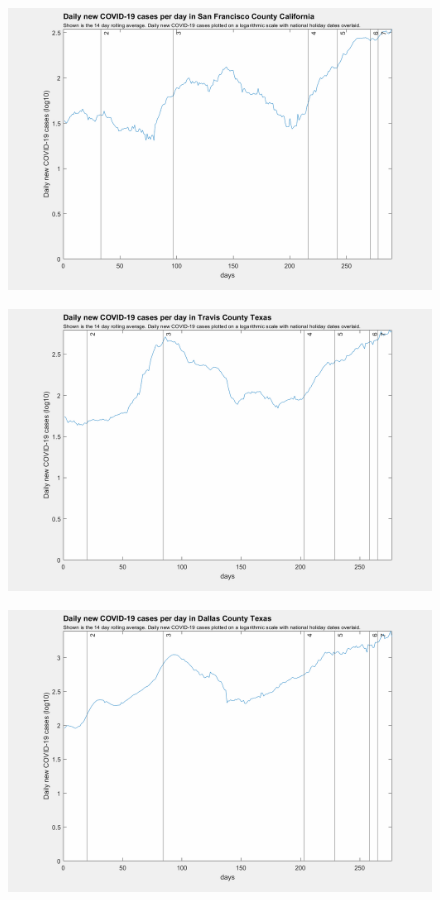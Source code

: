 \documentclass[]{article}
\begin{document}
\begin{figure}[!h]
	\includegraphics[width=\linewidth]{images/san_francisco_cases_holiday_log.png}
	\caption{}
	\label{fig:images/san_francisco_cases_holiday_logLabel}
\end{figure}


\begin{figure}[!h]
	\includegraphics[width=\linewidth]{images/travis_cases_holiday_log.png}
	\caption{}
	\label{fig:images/travis_cases_holiday_logLabel}
\end{figure}

\begin{figure}[!h]
	\includegraphics[width=\linewidth]{images/dallas_cases_holiday_log.png}
	\caption{}
	\label{fig:images/dallas_cases_holiday_logLabel}
\end{figure}
\end{document}
